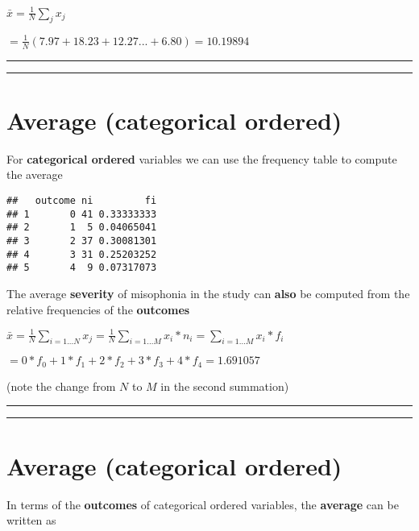 \documentclass[
]{book}
\begin{document}
\(\bar{x}= \frac{1}{N}\sum_j x_j\)

\(= \frac{1}{N}(7.97 + 18.23 + 12.27... + 6.80) = 10.19894\)

\begin{center}\rule{0.5\linewidth}{0.5pt}\end{center}

\begin{center}\rule{0.5\linewidth}{0.5pt}\end{center}

\hypertarget{average-categorical-ordered}{%
\section{Average (categorical ordered)}\label{average-categorical-ordered}}

For \textbf{categorical ordered} variables we can use the frequency table to compute the average

\begin{verbatim}
##   outcome ni         fi
## 1       0 41 0.33333333
## 2       1  5 0.04065041
## 3       2 37 0.30081301
## 4       3 31 0.25203252
## 5       4  9 0.07317073
\end{verbatim}

The average \textbf{severity} of misophonia in the study
can \textbf{also} be computed from the relative frequencies of the \textbf{outcomes}

\(\bar{x}=\frac{1}{N}\sum_{i=1...N} x_j=\frac{1}{N}\sum_{i=1...M} x_i*n_{i}=\sum_{i=1...M} x_i*f_{i}\)

\(=0*f_{0}+1*f_{1}+2*f_{2}+3*f_{3}+4*f_{4}=1.691057\)

(note the change from \(N\) to \(M\) in the second summation)

\begin{center}\rule{0.5\linewidth}{0.5pt}\end{center}

\begin{center}\rule{0.5\linewidth}{0.5pt}\end{center}

\hypertarget{average-categorical-ordered-1}{%
\section{Average (categorical ordered)}\label{average-categorical-ordered-1}}

In terms of the \textbf{outcomes} of categorical ordered variables, the \textbf{average} can be written as
\end{document}
